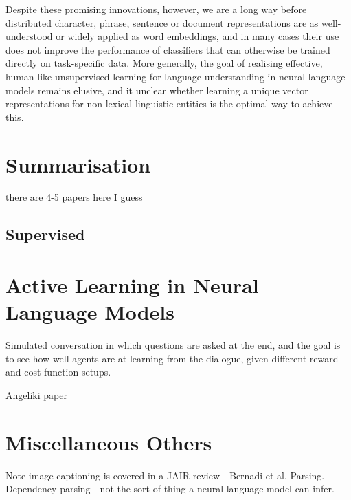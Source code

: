 \documentclass[11pt,letterpaper]{article}
\begin{document}
Despite these promising innovations, however, we are a long way before distributed character, phrase, sentence or document representations are as well-understood or widely applied as word embeddings, and in many cases their use does not improve the performance of classifiers that can otherwise be trained directly on task-specific data. More generally, the goal of realising effective, human-like unsupervised learning for language understanding in neural language models remains elusive, and it unclear whether learning a unique vector representations for non-lexical linguistic entities is the optimal way to achieve this. 


\section{Summarisation}
there are 4-5 papers here I guess

\subsection{Supervised}

\section{Active Learning in Neural Language Models}

\cite{weston2016dialog} Simulated conversation in which questions are asked at the end, and the goal is to see how well agents are at learning from the dialogue, given different reward and cost function setups. 

Angeliki paper

\cite{li2016deep} %

\section{Miscellaneous Others}

Note image captioning is covered in a JAIR review - Bernadi et al. Parsing. Dependency parsing - not the sort of thing a neural language model can infer.  
 










\end{document}
